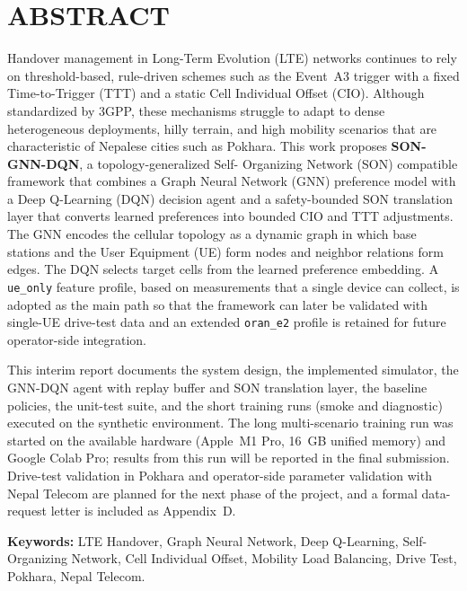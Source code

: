 \documentclass[12pt,a4paper,oneside]{report}
\begin{document}
\chapter*{ABSTRACT}

Handover management in Long-Term Evolution (LTE) networks continues to
rely on threshold-based, rule-driven schemes such as the Event~A3 trigger
with a fixed Time-to-Trigger (TTT) and a static Cell Individual Offset
(CIO). Although standardized by 3GPP, these mechanisms struggle to adapt
to dense heterogeneous deployments, hilly terrain, and high mobility
scenarios that are characteristic of Nepalese cities such as Pokhara.
This work proposes \textbf{SON-GNN-DQN}, a topology-generalized Self-
Organizing Network (SON) compatible framework that combines a Graph
Neural Network (GNN) preference model with a Deep Q-Learning (DQN)
decision agent and a safety-bounded SON translation layer that converts
learned preferences into bounded CIO and TTT adjustments. The GNN encodes
the cellular topology as a dynamic graph in which base stations and the
User Equipment (UE) form nodes and neighbor relations form edges. The
DQN selects target cells from the learned preference embedding. A
\texttt{ue\_only} feature profile, based on measurements that a single
device can collect, is adopted as the main path so that the framework
can later be validated with single-UE drive-test data and an extended
\texttt{oran\_e2} profile is retained for future operator-side
integration.

This interim report documents the system design, the implemented
simulator, the GNN-DQN agent with replay buffer and SON translation
layer, the baseline policies, the unit-test suite, and the short
training runs (smoke and diagnostic) executed on the synthetic
environment. The long multi-scenario training run was started on the
available hardware (Apple~M1 Pro, 16~GB unified memory) and Google Colab
Pro; results from this run will be reported in the final submission.
Drive-test validation in Pokhara and operator-side parameter validation
with Nepal Telecom are planned for the next phase of the project, and a
formal data-request letter is included as Appendix~D.

\vspace{0.6cm}
\noindent\textbf{Keywords:} LTE Handover, Graph Neural Network, Deep
Q-Learning, Self-Organizing Network, Cell Individual Offset, Mobility
Load Balancing, Drive Test, Pokhara, Nepal Telecom.

\renewcommand{\contentsname}{TABLE OF CONTENTS}
\tableofcontents
\clearpage
\end{document}
